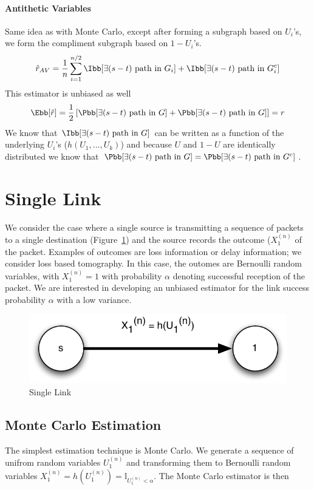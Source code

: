 \documentclass[11pt]{article}
\begin{document}
\paragraph{Antithetic Variables}
Same idea as with Monte Carlo, except after forming a subgraph based on $U_i$'s, we form the compliment subgraph based on $1-U_i$'s.
\[
\hat{r}_{AV}=\frac{1}{n}\displaystyle\sum_{i=1}^{n/2}\Ibb[\exists (s-t)~\mbox{path in}~G_i]+\Ibb[\exists (s-t)~\mbox{path in}~G_i^c]
\]
This estimator is unbiased as well
\[
\Ebb[\hat{r}]=\frac{1}{2}\left[\Pbb[\exists (s-t)~\mbox{path in}~G]+\Pbb[\exists (s-t)~\mbox{path in}~G]\right]=r
\]
We know that $\Ibb[\exists (s-t)~\mbox{path in}~G]$ can be written as a function of the underlying $U_i$'s ($h(U_1,\ldots,U_k)$) and because $U$ and $1-U$ are identically distributed we know that $\Pbb[\exists (s-t)~\mbox{path in}~G]=\Pbb[\exists (s-t)~\mbox{path in}~G^c]$.

\section{Single Link}
We consider the case where a single source is transmitting a sequence of packets to a single destination (Figure~\ref{fig:single_link}) and the source records the outcome ($X_{1}^{(n)}$ of the packet. Examples of outcomes are loss information or delay information; we consider loss based tomography. In this case, the outomes are Bernoulli random variables, with $X_{1}^{(n)}=1$ with probability $\alpha$ denoting successful reception of the packet. We are interested in developing an unbiased estimator for the link success probability $\alpha$ with a low variance.

\begin{figure}[ht!]
\centering
\includegraphics[width=0.4\columnwidth]{img/single_link}
\caption{Single Link}\label{fig:single_link}
\end{figure}

\subsection{Monte Carlo Estimation}
The simplest estimation technique is Monte Carlo. We generate a sequence of unifrom random variables $U_{1}^{(n)}$ and transforming them to Bernoulli random variables $X_{1}^{(n)} = h(U_{1}^{(n)}) = \mathbb{I}_{U_{1}^{(n)} < \alpha}$. The Monte Carlo estimator is then
\end{document}
